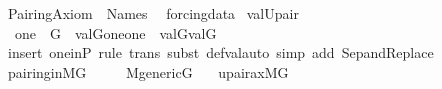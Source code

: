 %
\begin{isabellebody}%
%
%
\isadelimdocument
%
\endisadelimdocument
%
\isatagdocument
%
\isamarkuptrue%
%
\endisatagdocument
{\isafolddocument}%
%
\isadelimdocument
%
\endisadelimdocument
%
\isadelimtheory
%
\endisadelimtheory
%
\isatagtheory
{}\isamarkupfalse%
\ Pairing{\isacharunderscore}{\kern0pt}Axiom\ \ Names\ %
\endisatagtheory
{\isafoldtheory}%
%
\isadelimtheory
\isanewline
%
\endisadelimtheory
\isanewline
{}\isamarkupfalse%
\ forcing{\isacharunderscore}{\kern0pt}data\isanewline
{}\isanewline
\isanewline
{}\isamarkupfalse%
\ val{\isacharunderscore}{\kern0pt}Upair\ {\isacharcolon}{\kern0pt}\isanewline
\ \ {\isachardoublequoteopen}one\ {\isasymin}\ G\ {\isasymLongrightarrow}\ val{\isacharparenleft}{\kern0pt}G{\isacharcomma}{\kern0pt}{\isacharbraceleft}{\kern0pt}{\isasymlangle}{\isasymtau}{\isacharcomma}{\kern0pt}one{\isasymrangle}{\isacharcomma}{\kern0pt}{\isasymlangle}{\isasymrho}{\isacharcomma}{\kern0pt}one{\isasymrangle}{\isacharbraceright}{\kern0pt}{\isacharparenright}{\kern0pt}\ {\isacharequal}{\kern0pt}\ {\isacharbraceleft}{\kern0pt}val{\isacharparenleft}{\kern0pt}G{\isacharcomma}{\kern0pt}{\isasymtau}{\isacharparenright}{\kern0pt}{\isacharcomma}{\kern0pt}val{\isacharparenleft}{\kern0pt}G{\isacharcomma}{\kern0pt}{\isasymrho}{\isacharparenright}{\kern0pt}{\isacharbraceright}{\kern0pt}{\isachardoublequoteclose}\isanewline
%
\isadelimproof
\ \ %
\endisadelimproof
%
\isatagproof
{}\isamarkupfalse%
\ {\isacharparenleft}{\kern0pt}insert\ one{\isacharunderscore}{\kern0pt}in{\isacharunderscore}{\kern0pt}P{\isacharcomma}{\kern0pt}\ rule\ trans{\isacharcomma}{\kern0pt}\ subst\ def{\isacharunderscore}{\kern0pt}val{\isacharcomma}{\kern0pt}auto\ simp\ add{\isacharcolon}{\kern0pt}\ Sep{\isacharunderscore}{\kern0pt}and{\isacharunderscore}{\kern0pt}Replace{\isacharparenright}{\kern0pt}%
\endisatagproof
{\isafoldproof}%
%
\isadelimproof
\isanewline
%
\endisadelimproof
\isanewline
{}\isamarkupfalse%
\ pairing{\isacharunderscore}{\kern0pt}in{\isacharunderscore}{\kern0pt}MG\ {\isacharcolon}{\kern0pt}\ \isanewline
\ \ \ {\isachardoublequoteopen}M{\isacharunderscore}{\kern0pt}generic{\isacharparenleft}{\kern0pt}G{\isacharparenright}{\kern0pt}{\isachardoublequoteclose}\isanewline
\ \ \ {\isachardoublequoteopen}upair{\isacharunderscore}{\kern0pt}ax{\isacharparenleft}{\kern0pt}{\isacharhash}{\kern0pt}{\isacharhash}{\kern0pt}M{\isacharbrackleft}{\kern0pt}G{\isacharbrackright}{\kern0pt}{\isacharparenright}{\kern0pt}{\isachardoublequoteclose}\isanewline

\end{isabellebody}
